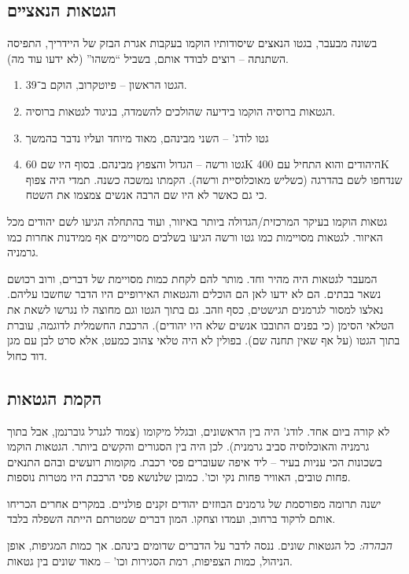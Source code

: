 \documentclass[a4paper]{book}
\begin{document}
	\subsection{הגטאות הנאציים}
	בשונה מבעבר, בגטו הנאצים שיסודותיו הוקמו בעקבות אגרת הבזק של היידריך, התפיסה השתנתה – רוצים לבודד אותם, בשביל ``משהו'' (לא ידעו עוד מה). 
	
	\begin{enumerate}
		\item הגטו הראשון – פיוטקרוב, הוקם ב־39. 
		\item הגטאות ברוסיה הוקמו בידיעה שהולכים להשמדה, בניגוד לגטאות ברוסיה. 
		\item גטו לודג' – השני מבינהם, מאוד מיוחד ועליו נדבר בהמשך
		\item גטו ורשה – הגדול והצפוץ מבינהם. בסוף היו שם 60K היהודים והוא התחיל עם 400K שנדחפו לשם בהדרגה (כשליש מאוכלוסיית ורשה). הקמתו נמשכה כשנה. תמדי היה צפוף כי גם כאשר לא היו שם הרבה אנשים צמצמו את השטח. 
	\end{enumerate}
	
	גטאות הוקמו בעיקר המרכזית/הגדולה ביותר באיזור, ועוד בהתחלה הגיעו לשם יהודים מכל האיזור. לגטאות מסויימות כמו גטו ורשה הגיעו בשלבים מסויימים אף ממידנות אחרות כמו גרמניה. 
	
	המעבר לגטאות היה מהיר וחד. מותר להם לקחת כמות מסויימת של דברים, ורוב רכושם נשאר בבתים. הם לא ידעו לאן הם הוכלים והגטאות האירופיים היו הדבר שחשבו עליהם. נאלצו למסור לגרמנים תגישטים, כסף וזהב. גם בתוך הגטו וגם מחוצה לו נגרשו לשאת את הטלאי הסימן (כי בפנים התובבו אנשים שלא היו יהודים). הרכבת החשמלית לדוגמה, עוברת בתוך הגטו (על אף שאין תחנה שם). בפולין לא היה טלאי צהוב כמעט, אלא סרט לבן עם מגן דוד כחול. 
	
	\subsection{הקמת הגטאות}
	לא קורה ביום אחד. לודג' היה בין הראשונים, ובגלל מיקומו (צמוד לגנרל גוברנמן, אבל בתוך גרמניה והאוכלוסיה סביב גרמנית). לכן היה בין הסגורים והקשים ביותר. הגטאות הוקמו בשכונות הכי עניות בעיר – ליד איפה שעוברים פסי רכבת. מקומות רועשים ובהם התנאים פחות טובים, האוויר פחות נקי וכו'. כמובן שלנושא פסי הרכבת היו מטרות נוספות. 
	
	ישנה תרומה מפורסמת של גרמנים הבוזזים יהודים זקנים פולניים. במקרים אחרים הכריחו אותם לרקוד ברחוב, ועמדו וצחקו. המון דברים שמטרתם הייתה השפלה בלבד. 
	
	\textit{הבהרה: }כל הגטאות שונים. ננסה לדבר על הדברים שדומים בינהם. אך כמות המגיפות, אופן הניהול, כמות הצפיפות, רמת הסגירות וכו' – מאוד שונים בין גטאות. 
	
\end{document}
